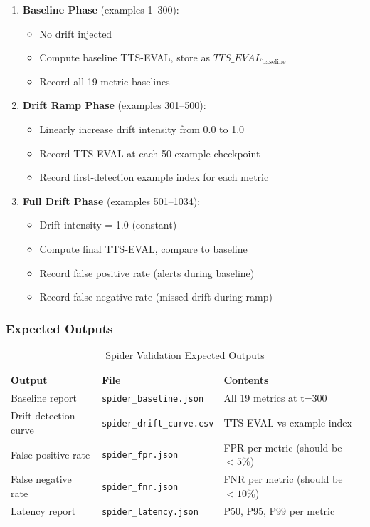 \begin{enumerate}
  \item \textbf{Baseline Phase} (examples 1--300):
    \begin{itemize}
      \item No drift injected
      \item Compute baseline TTS-EVAL, store as $TTS\_EVAL_{\text{baseline}}$
      \item Record all 19 metric baselines
    \end{itemize}
  
  \item \textbf{Drift Ramp Phase} (examples 301--500):
    \begin{itemize}
      \item Linearly increase drift intensity from 0.0 to 1.0
      \item Record TTS-EVAL at each 50-example checkpoint
      \item Record first-detection example index for each metric
    \end{itemize}
  
  \item \textbf{Full Drift Phase} (examples 501--1034):
    \begin{itemize}
      \item Drift intensity = 1.0 (constant)
      \item Compute final TTS-EVAL, compare to baseline
      \item Record false positive rate (alerts during baseline)
      \item Record false negative rate (missed drift during ramp)
    \end{itemize}
\end{enumerate}

\subsubsection{Expected Outputs}

\begin{table}[htbp]
\centering
\caption{Spider Validation Expected Outputs}
\begin{tabular}{l l l}
\toprule
\textbf{Output} & \textbf{File} & \textbf{Contents} \\
\midrule
Baseline report & \texttt{spider\_baseline.json} & All 19 metrics at t=300 \\
Drift detection curve & \texttt{spider\_drift\_curve.csv} & TTS-EVAL vs example index \\
False positive rate & \texttt{spider\_fpr.json} & FPR per metric (should be $<5\%$) \\
False negative rate & \texttt{spider\_fnr.json} & FNR per metric (should be $<10\%$) \\
Latency report & \texttt{spider\_latency.json} & P50, P95, P99 per metric \\
\bottomrule
\end{tabular}
\end{table}

